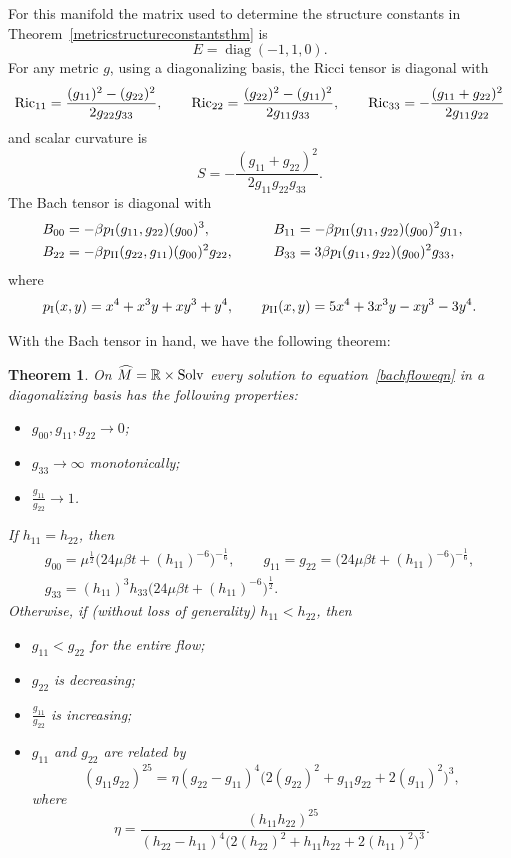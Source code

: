 \documentclass[10pt,a4paper]{amsart}
\numberwithin{equation}{section}
\newtheorem{Theorem}{Theorem}[section]
\newcommand{\diag}{\operatorname{diag}} %
\begin{document}
For this manifold the matrix used to determine the structure constants in Theorem~\ref{metricstructureconstantsthm} is
\[
E = \diag(-1, 1, 0).
\]
For any metric $g$, using a diagonalizing basis, the Ricci tensor is diagonal with
\begin{gather*}
{\rm Ric}_{11} = \frac{(g_{11})^2 - (g_{22})^2}{2 g_{22} g_{33}},\qquad
{\rm Ric}_{22} = \frac{(g_{22})^2 - (g_{11})^2}{2 g_{11} g_{33}},\qquad
{\rm Ric}_{33} = - \frac{(g_{11} + g_{22})^2}{2 g_{11} g_{22}}
\end{gather*}
and scalar curvature is
\[
S = -\frac{(g_{11} + g_{22})^2}{2 g_{11} g_{22} g_{33}}.
\]
The Bach tensor is diagonal with
\begin{alignat*}{3}
& B_{00} = -\beta p_{\rm I}(g_{11}, g_{22}) (g_{00})^3, \qquad &&
B_{11} = -\beta p_{\rm II}(g_{11}, g_{22}) (g_{00})^2 g_{11}, & \\
& B_{22} = -\beta p_{\rm II}(g_{22}, g_{11}) (g_{00})^2 g_{22}, \qquad&&
B_{33} = 3\beta p_{\rm I}(g_{11}, g_{22}) (g_{00})^2 g_{33},&
\end{alignat*}
where
\begin{gather*}
p_{\rm I}(x, y) = x^4 + x^3y + xy^3 + y^4, \qquad
p_{\rm II}(x, y) = 5x^4 + 3x^3y - xy^3 - 3y^4.
\end{gather*}

With the Bach tensor in hand, we have the following theorem:


\begin{Theorem} \label{solvthm} On $\widehat{M} = \mathbb{R} \times {\rm Solv}$ every solution to equation~\eqref{bachfloweqn} in a diagonalizing basis has the following properties:
\begin{itemize}\itemsep=0pt
\item $g_{00}, g_{11}, g_{22} \rightarrow 0$;
\item $g_{33} \rightarrow \infty$ monotonically;
\item $\frac{g_{11}}{g_{22}} \rightarrow 1$.
\end{itemize}
If $h_{11} = h_{22}$, then
\begin{gather*}
g_{00} = \mu^{\frac{1}{2}} \bigl(24 \mu \beta t + (h_{11})^{-6} \bigr)^{-\frac{1}{6}},\qquad
g_{11} = g_{22} = \bigl(24 \mu \beta t + (h_{11})^{-6} \bigr)^{-\frac{1}{6}}, \\
g_{33} = (h_{11})^3 h_{33} \bigl(24 \mu \beta t + (h_{11})^{-6} \bigr)^{\frac{1}{2}}.
\end{gather*}
Otherwise, if (without loss of generality) $h_{11} < h_{22}$, then
\begin{itemize}\itemsep=0pt
\item $g_{11} < g_{22}$ for the entire flow;
\item $g_{22}$ is decreasing;
\item $\frac{g_{11}}{g_{22}}$ is increasing;
\item $g_{11}$ and $g_{22}$ are related by
\[
(g_{11} g_{22})^{25} = \eta (g_{22}-g_{11})^{4} \big(2(g_{22})^2 + g_{11} g_{22} + 2(g_{11})^2\big)^{3},
\]
where
\[
\eta = \frac{(h_{11} h_{22})^{25}}{(h_{22}-h_{11})^{4}
				\big(2(h_{22})^2 + h_{11} h_{22} + 2(h_{11})^2\big)^{3}}.
\]
\end{itemize}
\end{Theorem}
\end{document}
